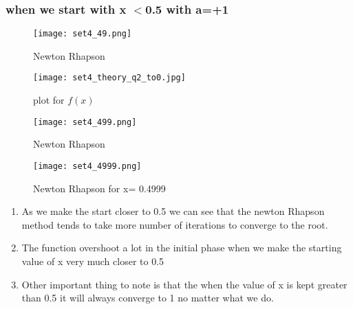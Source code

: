 \documentclass[a4paper]{article}
\begin{document}
    \subsubsection{when we start with x $<$0.5 with a=+1}
        \begin{figure}[!htbp]
          \centering
          \begin{minipage}[b]{0.45\textwidth}
\texttt{[image: set4\_49.png]}
            \caption{Newton Rhapson }
          \end{minipage}
          \hfill
          \begin{minipage}[b]{0.45\textwidth}
            \texttt{[image: set4\_theory\_q2\_to0.jpg]}
            \caption{plot for $f(x)$}
          \end{minipage}
        \end{figure}
         \begin{figure}[!htbp]
          \centering
          \begin{minipage}[b]{0.45\textwidth}
\texttt{[image: set4\_499.png]}
            \caption{Newton Rhapson }
          \end{minipage}
          \hfill
          \begin{minipage}[b]{0.45\textwidth}
            \texttt{[image: set4\_4999.png]}
            \caption{Newton Rhapson for x= 0.4999}
          \end{minipage}
        \end{figure}
        \begin{enumerate}
        \item As we make the start closer to 0.5 we can see that the newton Rhapson method tends to take more number of iterations to converge to the root.
        \item The function overshoot a lot in the initial phase when we make the starting value of x very much closer to 0.5
        
        \item Other important thing to note is that the when the value of x is kept greater than 0.5 it will always converge to 1 no matter what we do.  
        \end{enumerate}
        \newpage
\end{document}
